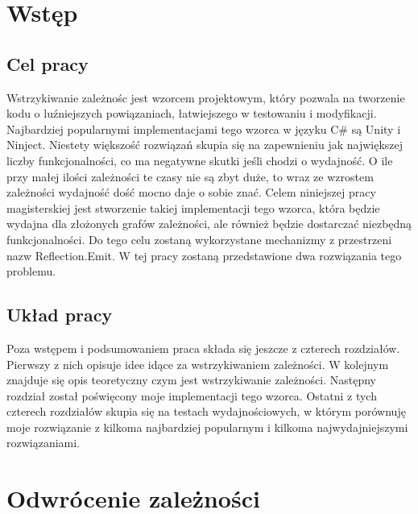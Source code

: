 \documentclass[12pt]{article}
\begin{document}
\clearpage
\section{Wstęp}
\subsection{Cel pracy}
Wstrzykiwanie zależnośc jest wzorcem projektowym, który pozwala na tworzenie kodu o luźniejszych powiązaniach, łatwiejszego w testowaniu i modyfikacji. Najbardziej popularnymi implementacjami tego wzorca w języku C\# są Unity i Ninject. Niestety większość rozwiązań skupia się na zapewnieniu jak największej liczby funkcjonalności, co ma negatywne skutki jeśli chodzi o wydajność. O ile przy małej ilości zależności te czasy nie są zbyt duże, to wraz ze wzrostem zależności wydajność dość mocno daje o sobie znać. Celem niniejszej pracy magisterskiej jest stworzenie takiej implementacji tego wzorca, która będzie wydajna dla złożonych grafów zależności, ale również będzie dostarczać niezbędną funkcjonalności. Do tego celu zostaną wykorzystane mechanizmy z przestrzeni nazw Reflection.Emit. W tej pracy zostaną przedstawione dwa rozwiązania tego problemu.

\subsection{Układ pracy}
Poza wstępem i podsumowaniem praca składa się jeszcze z czterech rozdziałów. Pierwszy z nich opisuje idee idące za wstrzykiwaniem zależności. W kolejnym znajduje się opis teoretyczny czym jest wstrzykiwanie zależności. Następny rozdział został poświęcony moje implementacji tego wzorca. Ostatni z tych czterech rozdziałów skupia się na testach wydajnościowych, w którym porównuję moje rozwiązanie z kilkoma najbardziej popularnym i kilkoma najwydajniejszymi rozwiązaniami.



\clearpage
\section{Odwrócenie zależności}
\end{document}
